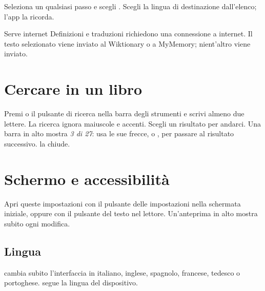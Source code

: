 \documentclass[11pt]{article}
\begin{document}
Seleziona un qualsiasi passo e scegli . Scegli la lingua di destinazione dall’elenco;
l’app la ricorda.

\begin{note}{Serve internet}
Definizioni e traduzioni richiedono una connessione a internet. Il testo selezionato viene inviato
al Wiktionary o a MyMemory; nient’altro viene inviato.
\end{note}

\section{Cercare in un libro}\label{sec:search}

Premi  o il pulsante di ricerca nella barra degli strumenti e scrivi almeno due
lettere. La ricerca ignora maiuscole e accenti. Scegli un risultato per andarci. Una barra in alto
mostra \emph{3 di 27}: usa le sue frecce, o , per passare al risultato successivo.
 la chiude.

\section{Schermo e accessibilità}\label{sec:display}

Apri queste impostazioni con il pulsante delle impostazioni nella schermata iniziale, oppure con il
pulsante del testo nel lettore. Un’anteprima in alto mostra subito ogni modifica.


\subsection{Lingua}
 cambia subito l’interfaccia in italiano, inglese, spagnolo, francese, tedesco
o portoghese.  segue la lingua del dispositivo.
\end{document}
